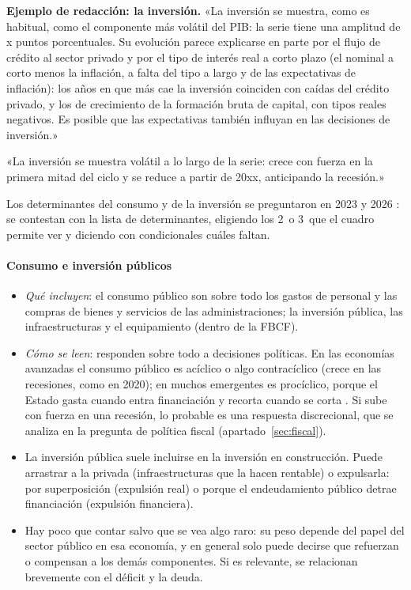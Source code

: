 \documentclass[11pt]{article}
\begin{document}
\begin{anotaciones}
\textbf{Ejemplo de redacción: la inversión.}
«La inversión se muestra, como es habitual, como el componente más volátil del PIB: la serie tiene una amplitud de x puntos porcentuales. Su evolución parece explicarse en parte por el flujo de crédito al sector privado y por el tipo de interés real a corto plazo (el nominal a corto menos la inflación, a falta del tipo a largo y de las expectativas de inflación): los años en que más cae la inversión coinciden con caídas del crédito privado, y los de crecimiento de la formación bruta de capital, con tipos reales negativos. Es posible que las expectativas también influyan en las decisiones de inversión.»

«La inversión se muestra volátil a lo largo de la serie: crece con fuerza en la primera mitad del ciclo y se reduce a partir de 20xx, anticipando la recesión.»
\end{anotaciones}

\begin{notaopositor}
Los determinantes del consumo y de la inversión se preguntaron en 2023 y 2026 \parencite{ATCEE2026Examenes}: se contestan con la lista de determinantes, eligiendo los 2~o 3~que el cuadro permite ver y diciendo con condicionales cuáles faltan.
\end{notaopositor}

\paragraph{Consumo e inversión públicos}
\begin{itemize}
\item \emph{Qué incluyen}: el consumo público son sobre todo los gastos de personal y las compras de bienes y servicios de las administraciones; la inversión pública, las infraestructuras y el equipamiento (dentro de la FBCF).
\item \emph{Cómo se leen}: responden sobre todo a decisiones políticas. En las economías avanzadas el consumo público es acíclico o algo contracíclico (crece en las recesiones, como en 2020); en muchos emergentes es procíclico, porque el Estado gasta cuando entra financiación y recorta cuando se corta \parencite{Kaminsky2004Rains}. Si sube con fuerza en una recesión, lo probable es una respuesta discrecional, que se analiza en la pregunta de política fiscal (apartado~\ref{sec:fiscal}).
\item La inversión pública suele incluirse en la inversión en construcción. Puede arrastrar a la privada (infraestructuras que la hacen rentable) o expulsarla: por superposición (expulsión real) o porque el endeudamiento público detrae financiación (expulsión financiera).
\item Hay poco que contar salvo que se vea algo raro: su peso depende del papel del sector público en esa economía, y en general solo puede decirse que refuerzan o compensan a los demás componentes. Si es relevante, se relacionan brevemente con el déficit y la deuda.
\end{itemize}
\end{document}

